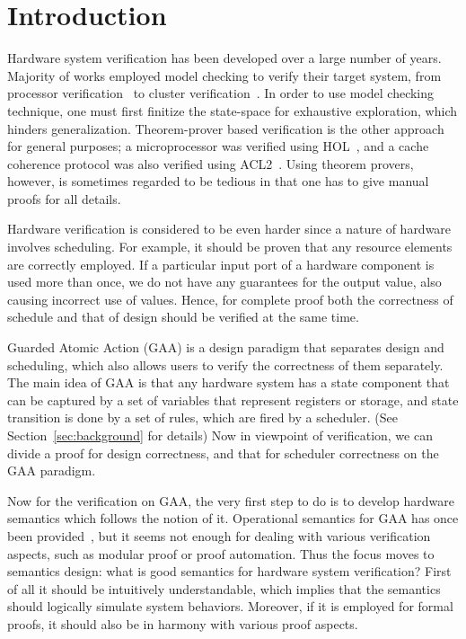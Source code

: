 \section{Introduction}
Hardware system verification has been developed over a large number of
years. Majority of works employed model checking to verify their
target system, from processor verification~\cite{ProcVerif1,
  ProcVerif2} to cluster verification~\cite{ClusterVerif}. In order to
use model checking technique, one must first finitize the state-space
for exhaustive exploration, which hinders generalization.
Theorem-prover based verification is the other approach for general
purposes; a microprocessor was verified using HOL~\cite{MicroVerif},
and a cache coherence protocol was also verified using
ACL2~\cite{CCVerif}. Using theorem provers, however, is sometimes
regarded to be tedious in that one has to give manual proofs for all
details.

Hardware verification is considered to be even harder since a nature
of hardware involves scheduling. For example, it should be proven that
any resource elements are correctly employed. If a particular input
port of a hardware component is used more than once, we do not have
any guarantees for the output value, also causing incorrect use of
values. Hence, for complete proof both the correctness of schedule and
that of design should be verified at the same time.

Guarded Atomic Action (GAA) is a design paradigm that separates design
and scheduling, which also allows users to verify the correctness of
them separately. The main idea of GAA is that any hardware system has
a state component that can be captured by a set of variables that
represent registers or storage, and state transition is done by a set
of rules, which are fired by a scheduler. (See
Section~\ref{sec:background} for details) Now in viewpoint of
verification, we can divide a proof for design correctness, and that
for scheduler correctness on the GAA paradigm.

Now for the verification on GAA, the very first step to do is to
develop hardware semantics which follows the notion of it.
Operational semantics for GAA has once been provided~\cite{SemGAA},
but it seems not enough for dealing with various verification aspects,
such as modular proof or proof automation. Thus the focus moves to
semantics design: what is good semantics for hardware system
verification? First of all it should be intuitively understandable,
which implies that the semantics should logically simulate system
behaviors. Moreover, if it is employed for formal proofs, it should
also be in harmony with various proof aspects.


